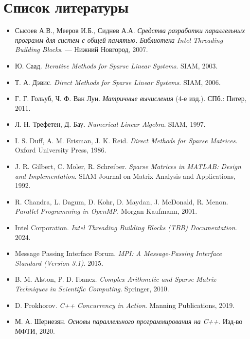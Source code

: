 \documentclass[12pt]{article}
\begin{document}
\section{Список литературы}
\begin{itemize}
  \item Сысоев А.В., Мееров И.Б., Сиднев А.А. \textit{Средства разработки параллельных программ для систем с общей памятью. Библиотека Intel Threading Building Blocks}. — Нижний Новгород, 2007.
  \item Ю. Саад. \emph{Iterative Methods for Sparse Linear Systems}. SIAM, 2003.
  \item Т. А. Дэвис. \emph{Direct Methods for Sparse Linear Systems}. SIAM, 2006.
  \item Г. Г. Гольуб, Ч. Ф. Ван Лун. \emph{Матричные вычисления} (4-е изд.). СПб.: Питер, 2011.
  \item Л. Н. Трефетен, Д. Бау. \emph{Numerical Linear Algebra}. SIAM, 1997.
  \item I. S. Duff, A. M. Erisman, J. K. Reid. \emph{Direct Methods for Sparse Matrices}. Oxford University Press, 1986.
  \item J. R. Gilbert, C. Moler, R. Schreiber. \emph{Sparse Matrices in MATLAB: Design and Implementation}. SIAM Journal on Matrix Analysis and Applications, 1992.
  \item R. Chandra, L. Dagum, D. Kohr, D. Maydan, J. McDonald, R. Menon. \emph{Parallel Programming in OpenMP}. Morgan Kaufmann, 2001.
  \item Intel Corporation. \emph{Intel Threading Building Blocks (TBB) Documentation}. 2024.
  \item Message Passing Interface Forum. \emph{MPI: A Message-Passing Interface Standard (Version 3.1)}. 2015.
  \item B. M. Alston, P. D. Ibanez. \emph{Complex Arithmetic and Sparse Matrix Techniques in Scientific Computing}. Springer, 2010.
  \item D. Prokhorov. \emph{C++ Concurrency in Action}. Manning Publications, 2019.
  \item М. А. Шериезян. \emph{Основы параллельного программирования на C++}. Изд-во МФТИ, 2020.
\end{itemize}
\end{document}
